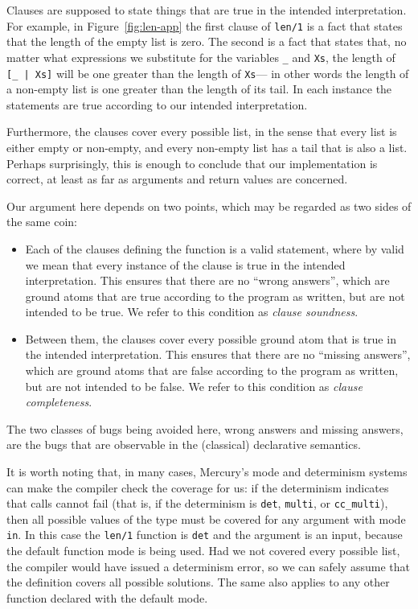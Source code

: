 Clauses are supposed to state things that are
true in the intended interpretation.
For example,
in Figure~\ref{fig:len-app}
the first clause of \texttt{len/1} is a fact that states
that the length of the empty list is zero.
The second is a fact that states that,
no matter what expressions we substitute
for the variables \texttt{\_} and \texttt{Xs},
the length of \texttt{[\_~|~Xs]} will be one greater than
the length of \texttt{Xs}---%
in other words the length of a non-empty list
is one greater than the length of its tail.
In each instance the statements are true
according to our intended interpretation.

Furthermore,
the clauses cover every possible list,
in the sense that every list is either empty or non-empty,
and every non-empty list has a tail that is also a list.
Perhaps surprisingly,
this is enough to conclude that our implementation is correct,
at least as far as arguments and return values are concerned.

Our argument here depends on two points,
which may be regarded as two sides of the same coin:
\begin{itemize}
\item
Each of the clauses defining the function is a valid statement,
where by valid we mean that every instance of the clause
is true in the intended interpretation.
This ensures that there are no ``wrong answers\label{gi:wrong-answer}'',
which are ground atoms that are true according to the program as written,
but are not intended to be true.
We refer to this condition as
\emph{clause soundness\label{gi:clause-soundness}}.
\item
Between them,
the clauses cover every possible ground atom
that is true in the intended interpretation.
This ensures that there are no ``missing answers\label{gi:missing-answer}'',
which are ground atoms that are false according to the program as written,
but are not intended to be false.
We refer to this condition as
\emph{clause completeness\label{gi:clause-completeness}}.
\end{itemize}
The two classes of bugs being avoided here,
wrong answers and missing answers,
are the bugs that are observable in
the (classical) declarative semantics.

It is worth noting that, in many cases,
Mercury's mode and determinism systems can
make the compiler check the coverage for us:
if the determinism indicates that calls cannot fail
(that is, if the determinism is
\texttt{det}, \texttt{multi}, or \texttt{cc\_multi}),
then all possible values of the type must be covered
for any argument with mode \texttt{in}.
In this case the \texttt{len/1} function is \texttt{det}
and the argument is an input,
because the default function mode is being used.
Had we not covered every possible list,
the compiler would have issued a determinism error,
so we can safely assume that
the definition covers all possible solutions.
The same also applies to any other function declared with
the default mode.

